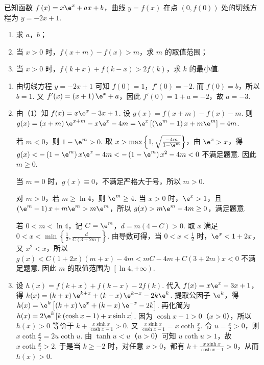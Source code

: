 \begin{problem}
已知函数 \(f\left( x \right)=x\e^x+ax+b\)，曲线 \(y=f\left( x \right)\) 在点 \(\left( 0,f\left( 0 \right) \right)\) 处的切线方程为 \(y=-2x+1\).

\begin{enumerate}
\item 求 \(a\)，\(b\)；
\item 当 \(x>0\) 时，\(f\left( x+m \right)-f\left( x \right)>m\)，求 \(m\) 的取值范围；
\item 当 \(x>0\) 时，\(f\left( k+x \right)+f\left( k-x \right)>2f\left( k \right)\)，求 \(k\) 的最小值.
\end{enumerate}
\end{problem}

\begin{solution}
\begin{enumerate}
\item 由切线方程 \(y=-2x+1\) 可知 \(f(0)=1\)，\(f'(0)=-2\). 而 \(f(0)=b\)，所以 \(b=1\).
又 \(f'(x)=\left( x+1 \right)\e^x+a\)，因此 \(f'(0)=1+a=-2\)，故 \(a=-3\).

\item 由（1）知 \(f(x)=x\e^x-3x+1\). 设 \(g(x)=f\left( x+m \right)-f(x)-m\). 则 \(g(x)=\left( x+m \right)\e^{x+m}-x\e^x-4m=\e^x\left[ \left( \e^m-1 \right)x+m\e^m \right]-4m\).

若 \(m<0\)，则 \(1-\e^m>0\). 取 \(x>\max\left\{1,\sqrt{\frac{-4m}{1-\e^m}}\right\}\)，由 \(\e^x>x\)，得
\(
g(x)<-\left( 1-\e^m \right)x\e^x-4m<-\left( 1-\e^m \right)x^2-4m<0
\)
不满足题意. 因此 \(m\ge 0\).

当 \(m=0\) 时，\(g(x)\equiv 0\)，不满足严格大于号，所以 \(m>0\).

对 \(m>0\)，若 \(m\ge \ln 4\)，则 \(\e^m\ge 4\). 当 \(x>0\) 时，\(\e^x>1\)，且 \(\left( \e^m-1 \right)x+m\e^m>m\e^m\)，所以 \(g(x)>m\e^m-4m\ge 0\)，满足题意.

若 \(0<m<\ln 4\)，记 \(C=\e^m\)，\(d=m\left( 4-C \right)>0\). 取 \(x\) 满足 \(0<x<\min\left\{\frac{1}{2},\frac{d}{C\left( 3+2m \right)}\right\}\). 由导数可得，当 \(0<x<\frac{1}{2}\) 时，\(\e^x<1+2x\)，又 \(x^2<x\)，所以
\(
g(x)<C\left( 1+2x \right)\left( m+x \right)-4m<mC-4m+C\left( 3+2m \right)x<0
\)
不满足题意. 因此 \(m\) 的取值范围为 \(\left[ \ln 4,+\infty \right)\).

\item 设 \(h(x)=f\left( k+x \right)+f\left( k-x \right)-2f(k)\). 代入 \(f(x)=x\e^x-3x+1\)，得 \(h(x)=\left( k+x \right)\e^{k+x}+\left( k-x \right)\e^{k-x}-2k\e^k\). 提取公因子 \(\e^k\)，得 \(h(x)=\e^k\left[ \left( k+x \right)\e^x+\left( k-x \right)\e^{-x}-2k \right]\). 再化简为 \(h(x)=2\e^k\left[ k\left( \cosh x-1 \right)+x\sinh x \right]\).
因为 \(\cosh x-1>0\)（\(x>0\)），所以 \(h(x)>0\) 等价于 \(k+\frac{x\sinh x}{\cosh x-1}>0\). 又 \(\frac{x\sinh x}{\cosh x-1}=x\coth \frac{x}{2}\). 令 \(u=\frac{x}{2}>0\)，则 \(x\coth \frac{x}{2}=2u\coth u\). 由 \(\tanh u<u\)（\(u>0\)）可知 \(u\coth u>1\)，故 \(x\coth \frac{x}{2}>2\). 于是当 \(k\ge -2\) 时，对任意 \(x>0\)，都有 \(k+\frac{x\sinh x}{\cosh x-1}>0\)，从而 \(h(x)>0\).


\end{enumerate}
\end{solution}
